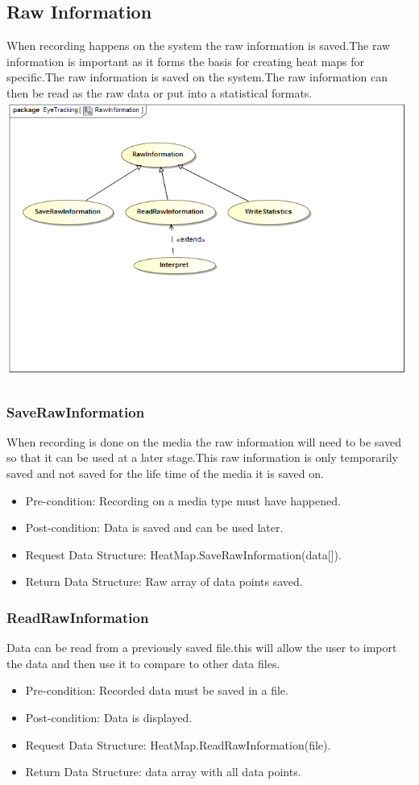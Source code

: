 		
\subsection{Raw Information}
When recording happens on the system the raw information is saved.The raw information is important as it forms the basis for creating heat maps for specific.The raw information is saved on the system.The raw information can then be read as the raw data or put into a statistical formats.
\newline
	\includegraphics[scale=0.5]{Diagrams/Use_Case_Diagram__RawInformation.png}
	\subsubsection{SaveRawInformation}
When recording is done on the media the raw information will need to be saved so that it can be used at a later stage.This raw information is only temporarily saved and not saved for the life time of the media it is saved on.
\begin{itemize}
\item Pre-condition: Recording on a media type must have happened.
\item Post-condition: Data is saved and can be used later.
\item Request Data Structure: HeatMap.SaveRawInformation(data[]).
\item Return Data Structure: Raw array of data points saved.
\end{itemize}

	\subsubsection{ReadRawInformation}
Data can be read from a previously saved file.this will allow the user to import the data and then use it to compare to other data files.
\begin{itemize}
\item Pre-condition: Recorded data must be saved in a file.
\item Post-condition: Data is displayed.
\item Request Data Structure: HeatMap.ReadRawInformation(file).
\item Return Data Structure: data array with all data points.
\end{itemize}

